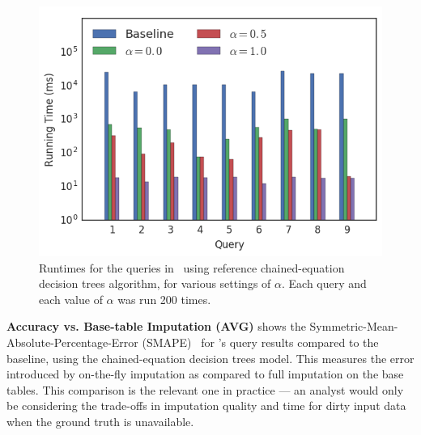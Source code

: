 {\begin{figure}
\includegraphics[width=\columnwidth]{figures/running_times_combined_bar.png}
\caption{Runtimes for the queries in~ using reference
    chained-equation decision trees algorithm, for various settings of $\alpha$.
    Each query and each value of $\alpha$ was run 200 times.}
\label{fig:runtimes}
\end{figure}




\begin{sloppypar}
\textbf{Accuracy vs. Base-table Imputation (AVG)}\quad {} shows the Symmetric-Mean-Absolute-Percentage-Error (SMAPE)~\cite{Makridakis2000451} for \ProjectName{}'s query results compared to the baseline, using the chained-equation decision trees model.
This measures the error introduced by on-the-fly imputation as compared to full imputation on the base tables.
This comparison is the relevant one in practice --- an analyst would only be considering the trade-offs in imputation quality and time for dirty input data when the ground truth is unavailable.
\end{sloppypar}

}

